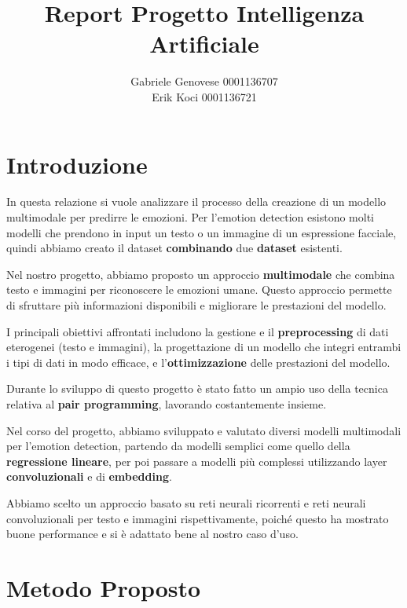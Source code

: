 \documentclass{article}
\title{Report Progetto Intelligenza Artificiale}
\author{Gabriele Genovese 0001136707\\ Erik Koci 0001136721 }
\begin{document}
\maketitle

\tableofcontents

\newpage 


\section{Introduzione}
In questa relazione si vuole analizzare il processo della creazione di un modello multimodale per predirre le emozioni. Per l'emotion detection esistono molti modelli che prendono in input un testo o un immagine di un espressione facciale, quindi abbiamo creato il dataset \textbf{combinando} due \textbf{dataset} esistenti.

\bigskip

Nel nostro progetto, abbiamo proposto un approccio \textbf{multimodale} che combina testo e immagini per riconoscere le emozioni umane. Questo approccio permette di sfruttare più informazioni disponibili e migliorare le prestazioni del modello.

\bigskip

I principali obiettivi affrontati includono la gestione e il \textbf{preprocessing} di dati eterogenei (testo e immagini), la progettazione di un modello che integri entrambi i tipi di dati in modo efficace, e l'\textbf{ottimizzazione} delle prestazioni del modello.

\bigskip

Durante lo sviluppo di questo progetto è stato fatto un ampio uso della tecnica relativa al \textbf{pair programming}, lavorando costantemente insieme.

\bigskip

Nel corso del progetto, abbiamo sviluppato e valutato diversi modelli multimodali per l'emotion detection, partendo da modelli semplici come quello della \textbf{regressione lineare}, per poi passare a modelli più complessi utilizzando layer \textbf{convoluzionali} e di \textbf{embedding}.

\bigskip

Abbiamo scelto un approccio basato su reti neurali ricorrenti e reti neurali convoluzionali per testo e immagini rispettivamente, poiché questo ha mostrato buone performance e si è adattato bene al nostro caso d'uso.

\newpage

\section{Metodo Proposto}
\end{document}
